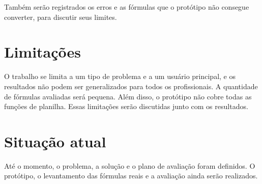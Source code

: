 Também serão registrados os erros e as fórmulas que o protótipo não consegue converter, para discutir seus limites.

\section{Limitações}

O trabalho se limita a um tipo de problema e a um usuário principal, e os resultados não podem ser generalizados para todos os profissionais. A quantidade de fórmulas avaliadas será pequena. Além disso, o protótipo não cobre todas as funções de planilha. Essas limitações serão discutidas junto com os resultados.

\section{Situação atual}

Até o momento, o problema, a solução e o plano de avaliação foram definidos. O protótipo, o levantamento das fórmulas reais e a avaliação ainda serão realizados.
